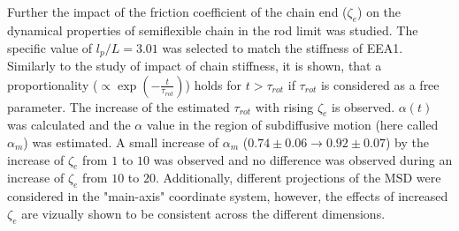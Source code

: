 \documentclass[
    paper=A4,pagesize=automedia,fontsize=12pt,
    BCOR=15mm,DIV=22,
    twoside,headinclude,footinclude=false,
    fleqn,             %
    bibliography=totocnumbered,          %
    listof=totoc,                %
    listof=flat,                 %
    cleardoublepage=empty      %
    numbers=endperiod
]{scrartcl}
\begin{document}
\\
\\
Further the impact of the friction coefficient of the chain end ($\zeta_e$) 
on the dynamical properties of semiflexible chain in the rod limit was studied.
The specific value of $l_p/L=3.01$ was selected to match the stiffness of
EEA1. Similarly to the study of impact of chain stiffness, it is shown,
that a proportionality ($\propto \exp\left(-\frac{t}{\tau_{rot}}\right)$) holds
for $t>\tau_{rot}$ if $\tau_{rot}$ is considered as a free parameter.
The increase of the estimated $\tau_{rot}$ with rising $\zeta_e$ is observed.
$\alpha(t)$ was calculated and the $\alpha$ value in the region of subdiffusive motion
(here called $\alpha_m$) was estimated. A small
increase of $\alpha_m$
($0.74 \pm 0.06 \rightarrow 0.92 \pm 0.07$) by the 
increase of $\zeta_e$ from $1$ to $10$ was observed and no difference was observed
during an increase of $\zeta_e$ from $10$ to $20$. Additionally, different projections
of the MSD were considered in the "main-axis" coordinate system, however, the effects of 
increased $\zeta_e$ are vizually shown to be consistent across the different dimensions.
\end{document}
